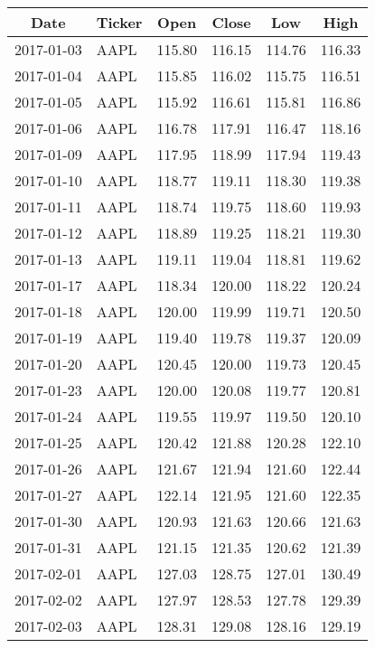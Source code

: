 \documentclass[12pt,a4paper]{report}
\begin{document}
\begin{appendices}
\begin{longtable}{llllll}
  \hline
  \multicolumn{1}{c}{Date}   & \multicolumn{1}{c}{Ticker} & \multicolumn{1}{c}{Open}   & \multicolumn{1}{c}{Close} &  \multicolumn{1}{c}{Low}  &   \multicolumn{1}{c}{High}\\
  \hline
  \endhead
2017-01-03 & AAPL & 115.80 & 116.15 & 114.76 & 116.33 \\ 
  2017-01-04 & AAPL & 115.85 & 116.02 & 115.75 & 116.51 \\ 
  2017-01-05 & AAPL & 115.92 & 116.61 & 115.81 & 116.86 \\ 
  2017-01-06 & AAPL & 116.78 & 117.91 & 116.47 & 118.16 \\ 
  2017-01-09 & AAPL & 117.95 & 118.99 & 117.94 & 119.43 \\ 
  2017-01-10 & AAPL & 118.77 & 119.11 & 118.30 & 119.38 \\ 
  2017-01-11 & AAPL & 118.74 & 119.75 & 118.60 & 119.93 \\ 
  2017-01-12 & AAPL & 118.89 & 119.25 & 118.21 & 119.30 \\ 
  2017-01-13 & AAPL & 119.11 & 119.04 & 118.81 & 119.62 \\ 
  2017-01-17 & AAPL & 118.34 & 120.00 & 118.22 & 120.24 \\ 
  2017-01-18 & AAPL & 120.00 & 119.99 & 119.71 & 120.50 \\ 
  2017-01-19 & AAPL & 119.40 & 119.78 & 119.37 & 120.09 \\ 
  2017-01-20 & AAPL & 120.45 & 120.00 & 119.73 & 120.45 \\ 
  2017-01-23 & AAPL & 120.00 & 120.08 & 119.77 & 120.81 \\ 
  2017-01-24 & AAPL & 119.55 & 119.97 & 119.50 & 120.10 \\ 
  2017-01-25 & AAPL & 120.42 & 121.88 & 120.28 & 122.10 \\ 
  2017-01-26 & AAPL & 121.67 & 121.94 & 121.60 & 122.44 \\ 
  2017-01-27 & AAPL & 122.14 & 121.95 & 121.60 & 122.35 \\ 
  2017-01-30 & AAPL & 120.93 & 121.63 & 120.66 & 121.63 \\ 
  2017-01-31 & AAPL & 121.15 & 121.35 & 120.62 & 121.39 \\ 
  2017-02-01 & AAPL & 127.03 & 128.75 & 127.01 & 130.49 \\ 
  2017-02-02 & AAPL & 127.97 & 128.53 & 127.78 & 129.39 \\ 
  2017-02-03 & AAPL & 128.31 & 129.08 & 128.16 & 129.19 \\ 

\end{longtable}
\end{appendices}
\end{document}
